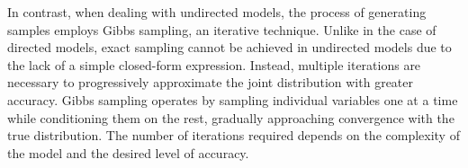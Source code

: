 \noindent In contrast, when dealing with undirected models, the process of generating samples employs Gibbs sampling, an iterative technique. Unlike in the case of directed models, exact sampling cannot be achieved in undirected models due to the lack of a simple closed-form expression. Instead, multiple iterations are necessary to progressively approximate the joint distribution with greater accuracy. Gibbs sampling operates by sampling individual variables one at a time while conditioning them on the rest, gradually approaching convergence with the true distribution. The number of iterations required depends on the complexity of the model and the desired level of accuracy.